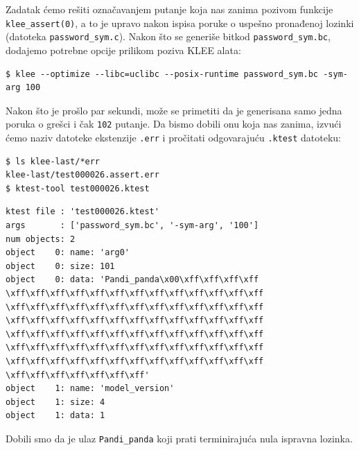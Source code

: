 Zadatak ćemo rešiti označavanjem putanje koja nas zanima pozivom funkcije \texttt{klee\_assert(0)}, a to je upravo nakon ispisa poruke o uspešno pronađenoj lozinki (datoteka \texttt{password\_sym.c}). Nakon što se generiše bitkod \texttt{password\_sym.bc}, dodajemo potrebne opcije prilikom poziva KLEE alata:

\begin{verbatim}
$ klee --optimize --libc=uclibc --posix-runtime password_sym.bc -sym-arg 100
\end{verbatim}

Nakon što je prošlo par sekundi, može se primetiti da je generisana samo jedna poruka o grešci i čak \texttt{102} putanje. Da bismo dobili onu koja nas zanima, izvući ćemo naziv datoteke ekstenzije \texttt{.err} i pročitati odgovarajuću \texttt{.ktest} datoteku:

\begin{verbatim}
$ ls klee-last/*err
klee-last/test000026.assert.err
$ ktest-tool test000026.ktest
\end{verbatim}

\begin{verbatim}
ktest file : 'test000026.ktest'
args       : ['password_sym.bc', '-sym-arg', '100']
num objects: 2
object    0: name: 'arg0'
object    0: size: 101
object    0: data: 'Pandi_panda\x00\xff\xff\xff\xff
\xff\xff\xff\xff\xff\xff\xff\xff\xff\xff\xff\xff\xff
\xff\xff\xff\xff\xff\xff\xff\xff\xff\xff\xff\xff\xff
\xff\xff\xff\xff\xff\xff\xff\xff\xff\xff\xff\xff\xff
\xff\xff\xff\xff\xff\xff\xff\xff\xff\xff\xff\xff\xff
\xff\xff\xff\xff\xff\xff\xff\xff\xff\xff\xff\xff\xff
\xff\xff\xff\xff\xff\xff\xff\xff\xff\xff\xff\xff\xff
\xff\xff\xff\xff\xff\xff\xff'
object    1: name: 'model_version'
object    1: size: 4
object    1: data: 1
\end{verbatim}

Dobili smo da je ulaz \texttt{Pandi\_panda} koji prati terminirajuća nula ispravna lozinka.
